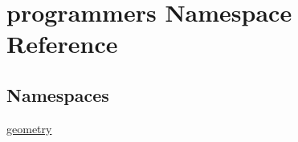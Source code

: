 \hypertarget{namespaceprogrammers}{}\section{programmers Namespace Reference}
\label{namespaceprogrammers}
\subsection*{Namespaces}
\begin{DoxyCompactItemize}
\item 
 \hyperlink{namespaceprogrammers_1_1geometry}{geometry}
\end{DoxyCompactItemize}

